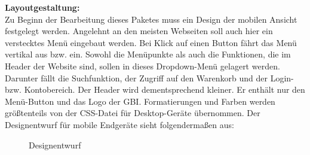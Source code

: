 \newpage
\textbf{Layoutgestaltung:}\\
Zu Beginn der Bearbeitung dieses Paketes muss ein Design der mobilen Ansicht festgelegt werden. Angelehnt an den meisten Webseiten soll auch hier ein verstecktes Menü eingebaut werden. Bei Klick auf einen Button fährt das Menü vertikal aus bzw. ein. Sowohl die Menüpunkte als auch die Funktionen, die im Header der Website sind, sollen in dieses Dropdown-Menü gelagert werden. Darunter fällt die Suchfunktion, der Zugriff auf den Warenkorb und der Login- bzw. Kontobereich. Der Header wird dementsprechend kleiner. Er enthält nur den Menü-Button und das Logo der GBI.
Formatierungen und Farben werden größtenteils von der CSS-Datei für Desktop-Geräte übernommen. 
Der Designentwurf für mobile Endgeräte sieht folgendermaßen aus:

	
\begin{figure}[H]
\begin{center}
\caption{Designentwurf}
\end{center}
\end{figure}

